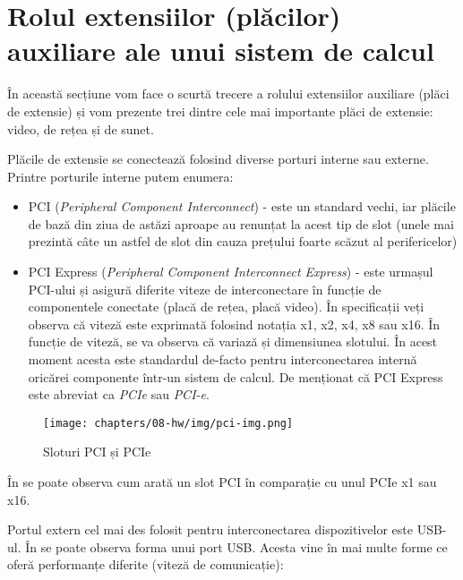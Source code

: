 \section{Rolul extensiilor (plăcilor) auxiliare ale unui sistem de calcul}
\label{sec:hw:extension}

În această secțiune vom face o scurtă trecere a rolului extensiilor auxiliare
(plăci de extensie) și vom prezente trei dintre cele mai importante plăci de
extensie: video, de rețea și de sunet.

Plăcile de extensie se conectează folosind diverse porturi interne sau externe.
Printre porturile interne putem enumera:

\begin{itemize}
	\item PCI 
		(\textit{Peripheral Component Interconnect}) - este un standard
		vechi, iar plăcile de bază din ziua de astăzi aproape au
		renunțat la acest tip de slot (unele mai prezintă câte un astfel
		de slot din cauza prețului foarte scăzut al perifericelor)
	\item PCI Express (\textit{Peripheral Component Interconnect Express}) -
		este urmașul PCI-ului și asigură diferite viteze de
		interconectare în funcție de componentele conectate (placă de
		rețea, placă video). În specificații veți observa că viteză
		este exprimată folosind notația x1, x2, x4, x8 sau x16. În
		funcție de viteză, se va observa că variază și dimensiunea
		slotului. În acest moment acesta este standardul de-facto pentru
		interconectarea internă oricărei componente într-un sistem de
		calcul. De menționat că PCI Express este abreviat ca
		\textit{PCIe} sau \textit{PCI-e}.
\end{itemize}

\begin{figure}[!htbp]
	\centering
	\texttt{[image: chapters/08-hw/img/pci-img.png]}
	\caption{Sloturi PCI și PCIe\protect\footnotemark}
	\label{fig:hw:pci}
\end{figure}


În  se poate observa cum arată un slot PCI în
comparație cu unul PCIe x1 sau x16.

Portul extern cel mai des folosit pentru interconectarea dispozitivelor este
USB-ul. În  se poate observa forma unui port USB. Acesta vine în mai
multe forme ce oferă performanțe diferite (viteză de comunicație):

